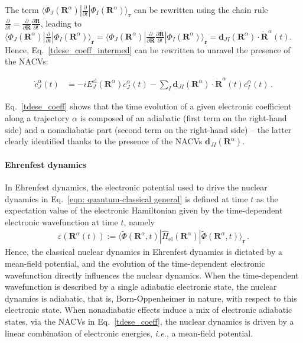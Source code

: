 \documentclass[9pt,bestpractices,pubversion]{livecoms}
\newcommand{\bra}[1]{\langle #1|}
\newcommand{\ket}[1]{|#1\rangle}
\newcommand{\bs}{\mathbf}
\begin{document}
The term $\bra{\Phi_J(\bs R^{\alpha})} \frac{\partial}{\partial t}\ket{\Phi_I(\bs R^{\alpha})}_{\mathbf{r}}$ can be rewritten using the chain rule $\frac{\partial}{\partial t} = \frac{\partial}{\partial \bs R}\frac{\partial \bs R}{\partial t}$, leading to $\bra{\Phi_J(\bs R^{\alpha})}\frac{\partial}{\partial t}\ket{\Phi_I(\bs R^{\alpha})}_{\mathbf{r}} = \bra{\Phi_J(\bs R^{\alpha})}  \frac{\partial}{\partial \bs R}\frac{\partial \bs R}{\partial t}  \ket{\Phi_I(\bs R^{\alpha})}_{\mathbf{r}} = \bs d_{JI}\left(\bs R^{\alpha}\right)\cdot \dot{\bs R}^{\alpha}(t)$.\cite{hammes94} Hence, Eq.~\eqref{tdese_coeff_intermed} can be rewritten to unravel the presence of the NACVs:

\begin{align}
\dot c_{J}^{\alpha}(t) &= -i  E_J^{\text{el}}\left(\bs R^{\alpha}\right)c_J^{\alpha}(t)-\sum_I  \bs d_{JI}\left(\bs R^{\alpha}\right)\cdot \dot{\bs R}^{\alpha}(t) c_I^{\alpha}(t) \, .
\label{tdese_coeff}
\end{align}

Eq.~\eqref{tdese_coeff} shows that the time evolution of a given electronic coefficient along a trajectory $\alpha$ is composed of an adiabatic (first term on the right-hand side) and a nonadiabatic part (second term on the right-hand side) -- the latter clearly identified thanks to the presence of the NACVs $\bs d_{JI}\left(\bs R^{\alpha}\right)$.

\paragraph{Ehrenfest dynamics}
In Ehrenfest dynamics, the electronic potential used to drive the nuclear dynamics in Eq.~\eqref{eqn: quantum-classical general} is defined at time $t$ as the expectation value of the electronic Hamiltonian given by the time-dependent electronic wavefunction at time $t$, namely
\begin{align}
 \varepsilon(\bs R^{\alpha}(t)) := \langle \tilde{\Phi}(\bs R^\alpha,t) | \hat{H}_\text{el}(\bs R^\alpha) | \tilde{\Phi}(\bs R^\alpha,t) \rangle_{\bs r} \,.
\label{ehrenfest}
\end{align}
Hence, the classical nuclear dynamics in Ehrenfest dynamics is dictated by a mean-field potential, and the evolution of the time-dependent electronic wavefunction directly influences the nuclear dynamics. When the time-dependent wavefunction is described by a single adiabatic electronic state, the nuclear dynamics is adiabatic, that is, Born-Oppenheimer in nature, with respect to this electronic state. When nonadiabatic effects induce a mix of electronic adiabatic states, via the NACVs in Eq.~\eqref{tdese_coeff}, the nuclear dynamics is driven by a linear combination of electronic energies, \textit{i.e.}, a mean-field potential.  
\end{document}
